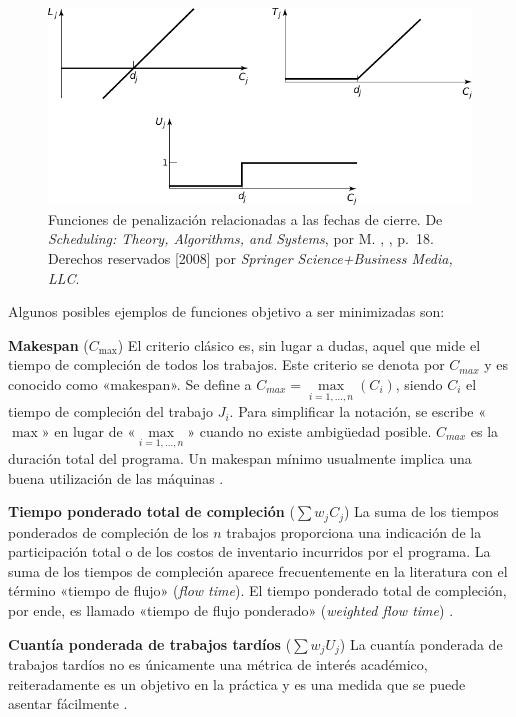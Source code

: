 \documentclass[spanish,draft,12pt,headsepline,footsepline,paper=letter]{scrreprt}
\begin{document}
\begin{figure}[hbtp]
\centering
\includegraphics[width=.8\textwidth]{media/penalty_functions.pdf}
\caption[Funciones de penalización]{Funciones de penalización relacionadas a las fechas de cierre. De \textit{Scheduling: Theory, Algorithms, and Systems}, por M. \citeauthor{Pinedo1995}, \citeyear{Pinedo1995}, p.~18. Derechos reservados [2008] por \textit{Springer Science+Business Media, LLC}.}
\label{fig:penalty_fun}
\end{figure}

Algunos posibles ejemplos de funciones objetivo a ser minimizadas son:

\textbf{Makespan} ($C_{\max}$) El criterio clásico es, sin lugar a dudas, aquel que mide el tiempo de compleción de todos los trabajos. Este criterio se denota por $C_{max}$ y es conocido como «makespan». Se define a $C_{max} = \underset{i=1,\dots,n}{\max}(C_i)$, siendo $C_i$ el tiempo de compleción del trabajo $J_i$. Para simplificar la notación, se escribe «$\max$» en lugar de «$\underset{i=1,\dots,n}{\max}$» cuando no existe ambigüedad posible. $C_{max}$ es la duración total del programa. Un makespan mínimo usualmente implica una buena utilización de las máquinas \citep[p.~13, p.~18]{TKindt2002,Pinedo1995}.

\textbf{Tiempo ponderado total de compleción} ($\sum w_jC_j$) La suma de los tiempos ponderados de compleción de los $n$ trabajos proporciona una indicación de la participación total o de los costos de inventario incurridos por el programa. La suma de los tiempos de compleción aparece frecuentemente en la literatura con el término «tiempo de flujo» (\textit{flow time}). El tiempo ponderado total de compleción, por ende, es llamado «tiempo de flujo ponderado» (\textit{weighted flow time}) \citep[p.~18]{Pinedo1995}.

\textbf{Cuantía ponderada de trabajos tardíos} ($\sum w_jU_j$) 
La cuantía ponderada de trabajos tardíos no es únicamente una métrica de interés académico, reiteradamente es un objetivo en la práctica y es una medida que se puede asentar fácilmente \citep[p.~19]{Pinedo1995}.
\end{document}
